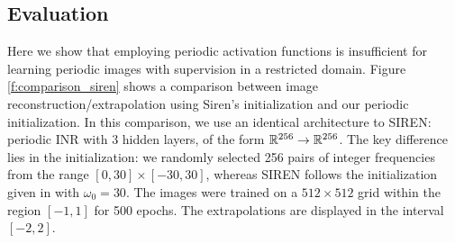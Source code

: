






\subsection{Evaluation}

Here we show that employing periodic activation functions is insufficient for learning periodic images with supervision in a restricted domain. Figure \ref{f:comparison_siren} shows a comparison between image reconstruction/extrapolation using Siren's initialization and our periodic initialization. In this comparison, we use an identical architecture to SIREN: periodic INR with 3 hidden layers, of the form $\mathbb{R}^{256}\to \mathbb{R}^{256}$. The key difference lies in the initialization: we randomly selected 256 pairs of integer frequencies from the range $[0, 30]\times[-30, 30]$, whereas SIREN follows the initialization given in \cite{sitzmann2019siren} with $\omega_0=30$. The images were trained on a $512\times512$ grid within the region $[-1, 1]$ for 500 epochs. The extrapolations are displayed in the interval $[-2, 2]$.




